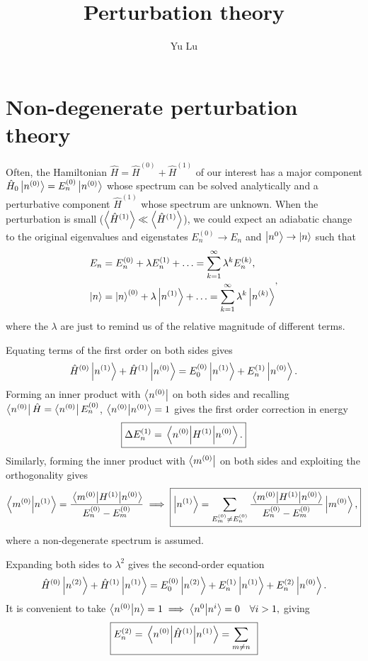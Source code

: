 \documentclass{article}
\title{Perturbation theory}
\author{Yu Lu}
\theoremstyle{nonumberplain}
\begin{document}
\maketitle
\section{Non-degenerate perturbation theory}
Often, the Hamiltonian $\hat{H} = \hat{H}^{(0)} + \hat{H}^{(1)}$ of our interest has a major component $\hat{H}_0 \ket{n^{(0)}} = E_n^{(0)} \ket{n^{(0)}} $ whose spectrum can be solved analytically and a perturbative component $\hat{H}^{(1)}$ whose spectrum are unknown. When the perturbation is small ($\expval{\hat{H}^{(1)}} \ll \expval{\hat{H}^{(1)}}$), we could expect an adiabatic change to the original eigenvalues and eigenstates $E_n^{(0)} \to E_n$ and $\ket{n^{0}} \to  \ket{n}$ such that
\[
    \begin{aligned}
    E_n &= E_n^{(0)} + \lambda E_n^{(1)} + \ldots 
    = \sum_{k=1}^{\infty} \lambda ^k E_n^{(k)}, \\
    \ket{n} &= \ket{n}^{(0)} + \lambda \ket{n^{(1)}} + \ldots 
    = \sum_{k=1}^{\infty} \lambda ^k \ket{n^{(k)}}
    \end{aligned},
\]
where the $\lambda $ are just to remind us of the relative magnitude of different terms. 

Equating terms of the first order on both sides gives 
\[
    \hat{H}^{(0)} \ket{n^{(1)}} + \hat{H}^{(1)}\ket{n^{(0)}} = E_0^{(0)} \ket{n^{(1)}} + E_n^{(1)} \ket{n^{(0)}}. 
\]
Forming an inner product with $\bra{n^{(0)}}$ on both sides and recalling $\bra{n^{(0)}} \hat{H} = \bra{n^{(0)}} E_n^{(0)}$, $\braket{n^{(0)}}{n^{(0)}}=1$ gives the first order correction in energy 
\[
    \boxed{
        \Delta E_n^{(1)} = \ev{H^{(1)}}{n^{(0)}}.
    }
\]
Similarly, forming the inner product with $\bra{m^{(0)}}$ on both sides and exploiting the orthogonality gives 
\[
    \braket{m^{(0)}}{n^{(1)}} = \frac{\mel{m^{(0)}}{H^{(1)}}{n^{(0)}}}{E_n^{(0)} - E_m^{(0)}} 
    \implies  
    \boxed{ 
        \ket{n^{(1)}} = \sum\limits_{E_m^{(0)} \neq E_n^{(0)}} \frac{\mel{m^{(0)}}{H^{(1)}}{n^{(0)}}}{E_n^{(0)} - E_m^{(0)}}  \ket{m^{(0)}},
    }
\]
where a non-degenerate spectrum is assumed. 

Expanding both sides to $\lambda ^{2} $ gives the second-order equation 
\[
    \hat{H}^{(0)} \ket{n^{(2)}} + \hat{H}^{(1)}\ket{n^{(1)}} = E_0^{(0)} \ket{n^{(2)}} + E_n^{(1)} \ket{n^{(1)}} + E_n^{(2)} \ket{n^{(0)}}. 
\]
It is convenient to take $\braket{n^{(0)}}{n} = 1 \implies \braket{n^{0}}{n^{i}} = 0 \quad \forall i>1,$ giving 
\[
    \boxed{ 
        E_n^{(2)} = \mel{n^{(0)}}{\hat{H} ^{(1)}}{n^{(1)}}
        = \sum_{m \neq n} \frac{}{} 
    }
\]
\end{document}
